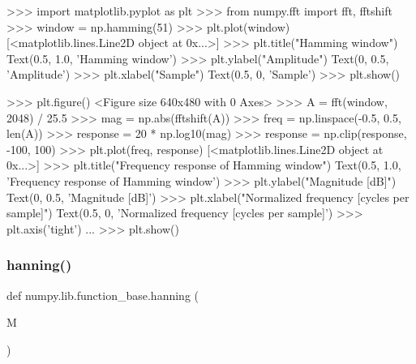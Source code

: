 \begin{DoxyVerb}
>>> import matplotlib.pyplot as plt
>>> from numpy.fft import fft, fftshift
>>> window = np.hamming(51)
>>> plt.plot(window)
[<matplotlib.lines.Line2D object at 0x...>]
>>> plt.title("Hamming window")
Text(0.5, 1.0, 'Hamming window')
>>> plt.ylabel("Amplitude")
Text(0, 0.5, 'Amplitude')
>>> plt.xlabel("Sample")
Text(0.5, 0, 'Sample')
>>> plt.show()

>>> plt.figure()
<Figure size 640x480 with 0 Axes>
>>> A = fft(window, 2048) / 25.5
>>> mag = np.abs(fftshift(A))
>>> freq = np.linspace(-0.5, 0.5, len(A))
>>> response = 20 * np.log10(mag)
>>> response = np.clip(response, -100, 100)
>>> plt.plot(freq, response)
[<matplotlib.lines.Line2D object at 0x...>]
>>> plt.title("Frequency response of Hamming window")
Text(0.5, 1.0, 'Frequency response of Hamming window')
>>> plt.ylabel("Magnitude [dB]")
Text(0, 0.5, 'Magnitude [dB]')
>>> plt.xlabel("Normalized frequency [cycles per sample]")
Text(0.5, 0, 'Normalized frequency [cycles per sample]')
>>> plt.axis('tight')
...
>>> plt.show()\end{DoxyVerb}
 \mbox{\label{namespacenumpy_1_1lib_1_1function__base_a7eab0ac591d5443267a7e956237e3daf}} 
\subsubsection{\texorpdfstring{hanning()}{hanning()}}
{\footnotesize\ttfamily def numpy.\+lib.\+function\+\_\+base.\+hanning (\begin{DoxyParamCaption}\item[{}]{M }\end{DoxyParamCaption})}

